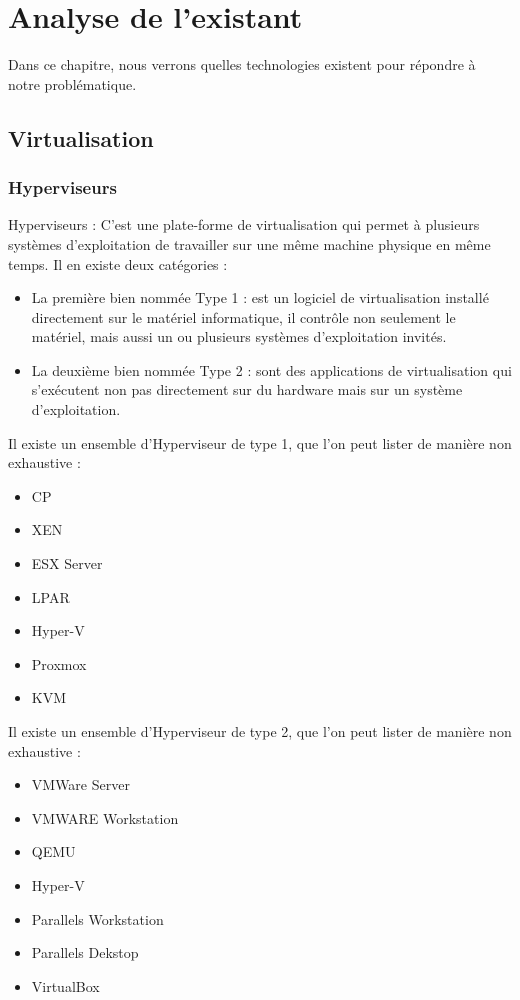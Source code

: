 \chapter{Analyse de l'existant}

Dans ce chapitre, nous verrons quelles technologies existent pour répondre à notre problématique.

\section{Virtualisation}



\subsection{Hyperviseurs}
\begin{mydef}
Hyperviseurs : C'est une plate-forme de virtualisation qui permet à plusieurs systèmes d'exploitation de travailler sur une même machine physique en même temps. Il en existe deux catégories : 
	\begin{itemize}
		\item La première bien nommée Type 1 : est un logiciel de virtualisation installé directement sur le matériel informatique, il contrôle non seulement le matériel, mais aussi un ou plusieurs systèmes d'exploitation invités.
		\item La deuxième bien nommée Type 2 : sont des applications de virtualisation qui s’exécutent non pas directement sur du hardware mais sur un système d’exploitation.
	\end{itemize}
\end{mydef}
Il existe un ensemble d'Hyperviseur de type 1, que l'on peut lister de manière non exhaustive : 

\begin{itemize}
\item CP
\item XEN
\item ESX Server
\item LPAR
\item Hyper-V
\item Proxmox
\item KVM
\end{itemize}

Il existe un ensemble d'Hyperviseur de type 2, que l'on peut lister de manière non exhaustive : 

\begin{itemize}
\item VMWare Server
\item VMWARE Workstation
\item QEMU
\item Hyper-V
\item Parallels Workstation
\item Parallels Dekstop
\item VirtualBox
\end{itemize}

